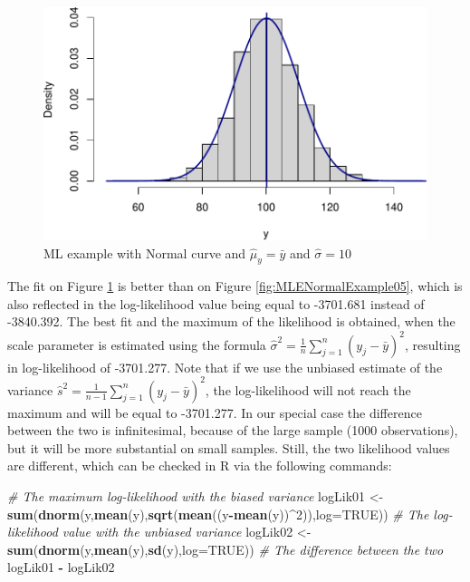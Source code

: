 \documentclass[
]{book}
\newenvironment{Shaded}{\begin{snugshade}}{\end{snugshade}}
\newcommand{\CommentTok}[1]{\textcolor[rgb]{0.56,0.35,0.01}{\textit{#1}}}
\newcommand{\DataTypeTok}[1]{\textcolor[rgb]{0.13,0.29,0.53}{#1}}
\newcommand{\DecValTok}[1]{\textcolor[rgb]{0.00,0.00,0.81}{#1}}
\newcommand{\KeywordTok}[1]{\textcolor[rgb]{0.13,0.29,0.53}{\textbf{#1}}}
\newcommand{\NormalTok}[1]{#1}
\newcommand{\OperatorTok}[1]{\textcolor[rgb]{0.81,0.36,0.00}{\textbf{#1}}}
\newcommand{\OtherTok}[1]{\textcolor[rgb]{0.56,0.35,0.01}{#1}}
\newcommand{\StringTok}[1]{\textcolor[rgb]{0.31,0.60,0.02}{#1}}
\theoremstyle{definition}
\theoremstyle{definition}
\theoremstyle{definition}
\theoremstyle{definition}
\theoremstyle{remark}
\begin{document}
\begin{figure}
\centering
\includegraphics{Svetunkov---Statistics-for-Business-Analytics_files/figure-latex/MLENormalExample06-1.pdf}
\caption{\label{fig:MLENormalExample06}ML example with Normal curve and \(\hat{\mu}_y=\bar{y}\) and \(\hat{\sigma}=10\)}
\end{figure}

The fit on Figure \ref{fig:MLENormalExample06} is better than on Figure \ref{fig:MLENormalExample05}, which is also reflected in the log-likelihood value being equal to -3701.681 instead of -3840.392. The best fit and the maximum of the likelihood is obtained, when the scale parameter is estimated using the formula \(\hat{\sigma}^2 = \frac{1}{n}\sum_{j=1}^n\left(y_j - \bar{y}\right)^2\), resulting in log-likelihood of -3701.277. Note that if we use the unbiased estimate of the variance \(\hat{s}^2 = \frac{1}{n-1}\sum_{j=1}^n\left(y_j - \bar{y}\right)^2\), the log-likelihood will not reach the maximum and will be equal to -3701.277. In our special case the difference between the two is infinitesimal, because of the large sample (1000 observations), but it will be more substantial on small samples. Still, the two likelihood values are different, which can be checked in R via the following commands:

\begin{Shaded}
\begin{Highlighting}[]
\CommentTok{\# The maximum log{-}likelihood with the biased variance}
\NormalTok{logLik01 \textless{}{-}}\StringTok{ }\KeywordTok{sum}\NormalTok{(}\KeywordTok{dnorm}\NormalTok{(y,}\KeywordTok{mean}\NormalTok{(y),}\KeywordTok{sqrt}\NormalTok{(}\KeywordTok{mean}\NormalTok{((y}\OperatorTok{{-}}\KeywordTok{mean}\NormalTok{(y))}\OperatorTok{\^{}}\DecValTok{2}\NormalTok{)),}\DataTypeTok{log=}\OtherTok{TRUE}\NormalTok{))}
\CommentTok{\# The log{-}likelihood value with the unbiased variance}
\NormalTok{logLik02 \textless{}{-}}\StringTok{ }\KeywordTok{sum}\NormalTok{(}\KeywordTok{dnorm}\NormalTok{(y,}\KeywordTok{mean}\NormalTok{(y),}\KeywordTok{sd}\NormalTok{(y),}\DataTypeTok{log=}\OtherTok{TRUE}\NormalTok{))}
\CommentTok{\# The difference between the two}
\NormalTok{logLik01 }\OperatorTok{{-}}\StringTok{ }\NormalTok{logLik02}
\end{Highlighting}
\end{Shaded}
\end{document}
